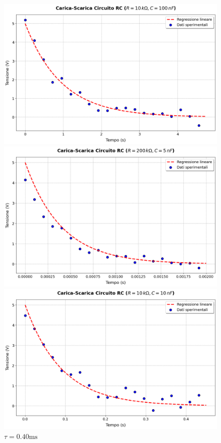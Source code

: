 \documentclass[a4paper,10pt]{article}
\begin{document}
\begin{figure}[htbp]
    \centering
    \begin{minipage}{0.32\textwidth}
        \centering
        \includegraphics[width=\linewidth]{assets/I/10-100.png}
        \caption{\(\tau = 0.95 \si{\milli\second}\)}
    \end{minipage}%
    \hfill
    \begin{minipage}{0.32\textwidth}
        \centering
        \includegraphics[width=\linewidth]{assets/I/200-5.png}
        \caption{\(\tau = 0.40 \si{\milli \second}\)}
    \end{minipage}%
    \hfill
    \begin{minipage}{0.32\textwidth}
        \centering
        \includegraphics[width=\linewidth]{assets/I/10-10.png}

\end{minipage}
\end{figure}
\end{document}
